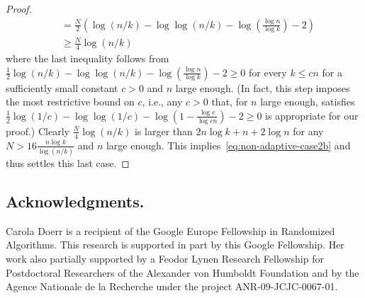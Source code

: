 \documentclass[english,a4paper,11pt]{article}
\newcommand{\comment}[1]{{\bf [#1]}}
\newcommand{\CW}[1]{\comment{\textcolor{blue}{CW: #1}}}
\begin{document}
{\begin{proof}
\begin{align*}
& = \frac N2 ( \log(n/k) - \log \log (n/k) - \log \left( \frac{\log n}{\log k} \right) - 2 ) \\
& \ge \frac N4 \log(n/k)
\end{align*}
where the last inequality follows from $\frac12 \log(n/k) - \log \log (n/k) - \log( \frac{\log n}{\log k} ) - 2 \ge 0$ for every $k \le cn$ for a sufficiently small constant $c > 0$ and $n$ large enough. (In fact, this step imposes the most restrictive bound on $c$, i.e., any $c > 0$ that, for $n$ large enough, satisfies $\frac12 \log(1/c) - \log \log (1/c) - \log( 1 - \frac{\log c}{\log cn}) - 2 \ge 0$ is appropriate for our proof.) Clearly $\frac N4 \log(n/k)$ is larger than $2n \log k + n + 2 \log n$ for any $N > 16 \frac{n \log k}{\log(n/k)}$ and $n$ large enough. This implies~\eqref{eq:non-adaptive-case2b} and thus settles this last case.
\end{proof}

\subsection*{Acknowledgments.} 
Carola Doerr is a recipient of the Google Europe Fellowship in Randomized Algorithms. This research is supported in part by this Google Fellowship. Her work also partially supported by a Feodor Lynen Research Fellowship for Postdoctoral Researchers of the Alexander von Humboldt Foundation and by the Agence Nationale de la Recherche under the project
ANR-09-JCJC-0067-01.

}%
\end{document}
